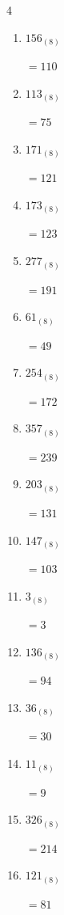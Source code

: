 \begin{multicols}{4}
\begin{enumerate}
        $=243$

  \item $156_{(8)}$

        $=110$

  \item $113_{(8)}$

        $=75$

  \item $171_{(8)}$

        $=121$

  \item $173_{(8)}$

        $=123$

  \item $277_{(8)}$

        $=191$

  \item $61_{(8)}$

        $=49$

  \item $254_{(8)}$

        $=172$

  \item $357_{(8)}$

        $=239$

  \item $203_{(8)}$

        $=131$

  \item $147_{(8)}$

        $=103$

  \item $3_{(8)}$

        $=3$

  \item $136_{(8)}$

        $=94$

\columnbreak %

  \item $36_{(8)}$

        $=30$

  \item $11_{(8)}$

        $=9$

  \item $326_{(8)}$

        $=214$

  \item $121_{(8)}$

        $=81$


\end{enumerate}
\end{multicols}
